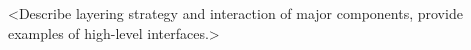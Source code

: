 

<Describe layering strategy and interaction of major components,
provide examples of high-level interfaces.>
